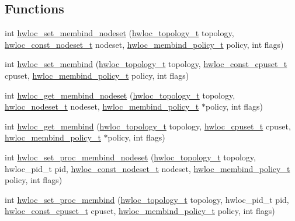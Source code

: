 \subsection*{Functions}
\begin{DoxyCompactItemize}
\item 
 int \hyperlink{a00050_ga747962cbb16fd12ad6d126011c734a27}{hwloc\_\-set\_\-membind\_\-nodeset} (\hyperlink{a00039_ga9d1e76ee15a7dee158b786c30b6a6e38}{hwloc\_\-topology\_\-t} topology, \hyperlink{a00040_ga2f5276235841ad66a79bedad16a5a10c}{hwloc\_\-const\_\-nodeset\_\-t} nodeset, \hyperlink{a00050_gac9764f79505775d06407b40f5e4661e8}{hwloc\_\-membind\_\-policy\_\-t} policy, int flags)
\item 
 int \hyperlink{a00050_ga8b6d1d90227aff8e44ef26bc1f8a8f95}{hwloc\_\-set\_\-membind} (\hyperlink{a00039_ga9d1e76ee15a7dee158b786c30b6a6e38}{hwloc\_\-topology\_\-t} topology, \hyperlink{a00040_ga1f784433e9b606261f62d1134f6a3b25}{hwloc\_\-const\_\-cpuset\_\-t} cpuset, \hyperlink{a00050_gac9764f79505775d06407b40f5e4661e8}{hwloc\_\-membind\_\-policy\_\-t} policy, int flags)
\item 
 int \hyperlink{a00050_ga7b46a4ca0b2db9723ca73b0c148ccd93}{hwloc\_\-get\_\-membind\_\-nodeset} (\hyperlink{a00039_ga9d1e76ee15a7dee158b786c30b6a6e38}{hwloc\_\-topology\_\-t} topology, \hyperlink{a00040_ga37e35730fa7e775b5bb0afe893d6d508}{hwloc\_\-nodeset\_\-t} nodeset, \hyperlink{a00050_gac9764f79505775d06407b40f5e4661e8}{hwloc\_\-membind\_\-policy\_\-t} $\ast$policy, int flags)
\item 
 int \hyperlink{a00050_gab07aedba1119f99130e5f0b796b7d8a5}{hwloc\_\-get\_\-membind} (\hyperlink{a00039_ga9d1e76ee15a7dee158b786c30b6a6e38}{hwloc\_\-topology\_\-t} topology, \hyperlink{a00040_ga4bbf39b68b6f568fb92739e7c0ea7801}{hwloc\_\-cpuset\_\-t} cpuset, \hyperlink{a00050_gac9764f79505775d06407b40f5e4661e8}{hwloc\_\-membind\_\-policy\_\-t} $\ast$policy, int flags)
\item 
 int \hyperlink{a00050_gaf10d18cd4703ec980d7440a1c23fa07f}{hwloc\_\-set\_\-proc\_\-membind\_\-nodeset} (\hyperlink{a00039_ga9d1e76ee15a7dee158b786c30b6a6e38}{hwloc\_\-topology\_\-t} topology, hwloc\_\-pid\_\-t pid, \hyperlink{a00040_ga2f5276235841ad66a79bedad16a5a10c}{hwloc\_\-const\_\-nodeset\_\-t} nodeset, \hyperlink{a00050_gac9764f79505775d06407b40f5e4661e8}{hwloc\_\-membind\_\-policy\_\-t} policy, int flags)
\item 
 int \hyperlink{a00050_gac63c4517e71b3f0d41b3dee3e83dc55c}{hwloc\_\-set\_\-proc\_\-membind} (\hyperlink{a00039_ga9d1e76ee15a7dee158b786c30b6a6e38}{hwloc\_\-topology\_\-t} topology, hwloc\_\-pid\_\-t pid, \hyperlink{a00040_ga1f784433e9b606261f62d1134f6a3b25}{hwloc\_\-const\_\-cpuset\_\-t} cpuset, \hyperlink{a00050_gac9764f79505775d06407b40f5e4661e8}{hwloc\_\-membind\_\-policy\_\-t} policy, int flags)

\end{DoxyCompactItemize}
